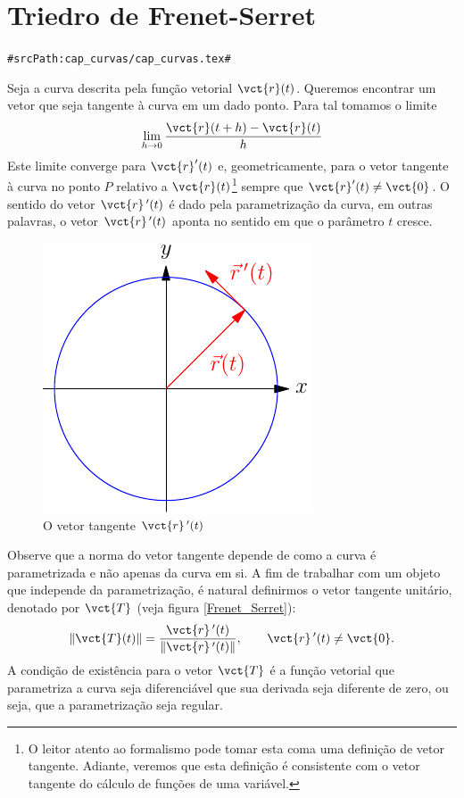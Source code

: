 \section{Triedro de Frenet-Serret}
\verb+#srcPath:cap_curvas/cap_curvas.tex#+


Seja a curva descrita pela função vetorial $\vct{r}(t)$. Queremos encontrar um vetor que seja tangente à curva em um dado ponto. Para tal tomamos o limite
$$\lim_{h\to 0} \frac{\vct{r}(t+h)-\vct{r}(t)}{h}$$  
Este limite converge para $\vct{r}'(t)$ e, geometricamente, para o vetor tangente à curva no ponto $P$ relativo a $\vct{r}(t)$\footnote{O leitor atento ao formalismo pode tomar esta coma uma definição de vetor tangente. Adiante, veremos que esta definição é consistente com o vetor tangente do cálculo de funções de uma variável.} sempre que $\vct{r}'(t)\neq \vct{0}$. O sentido do vetor $\vct{r}~\!'(t)$ é dado pela parametrização da curva, em outras palavras, o vetor $\vct{r}~\!'(t)$ aponta no sentido em que o parâmetro $t$ cresce.


\begin{figure}%
\begin{center}
    \includegraphics{./cap_curvas/figs/vetor_tangente_circunferencia}
\caption{O vetor tangente $\vct{r}\!~'(t)$}\label{circtang}
  \end{center}
\end{figure}


Observe que a norma do vetor tangente depende de como a curva é parametrizada e não apenas da curva em si. A fim de trabalhar com um objeto que independe da parametrização, é natural definirmos o vetor tangente unitário, denotado por $\vct{T}$ (veja figura \ref{Frenet_Serret}):
\begin{equation}\label{defvecunit}
\|\vct{T}(t)\|=\frac{\vct{r}\!~'(t)}{\left\|\vct{r}\!~'(t)\right\|},\qquad \vct{r}\!~'(t)\neq \vct{0}.
\end{equation} 
A condição de existência para o vetor $\vct{T}$ é a função vetorial que parametriza a curva seja diferenciável que sua derivada seja diferente de zero, ou seja, que a parametrização seja regular.

